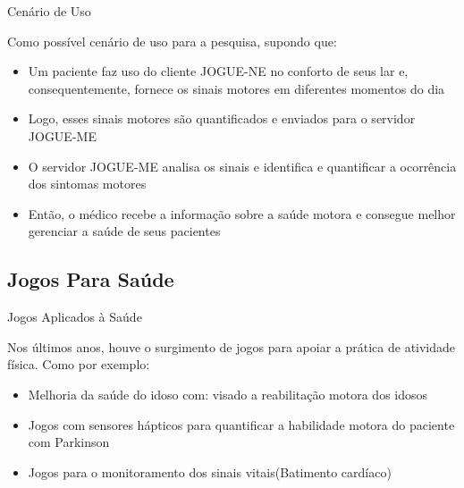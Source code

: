 \documentclass{beamer}
\begin{document}
\begin{frame}{Cenário de Uso}
   \begin{block}{ }
      Como possível cenário de uso para a pesquisa, supondo que:
      \begin{itemize}
       \item Um paciente faz uso do cliente JOGUE-NE no conforto de seus lar e, consequentemente, fornece os sinais motores em diferentes momentos do dia
       \item Logo, esses sinais motores são quantificados e enviados para o servidor JOGUE-ME
       \item O servidor JOGUE-ME analisa os sinais e identifica e quantificar a ocorrência dos sintomas motores
       \item Então, o médico recebe a informação sobre a saúde motora e consegue melhor gerenciar a saúde de seus pacientes 
      \end{itemize}
  \end{block}
\end{frame}

\subsection{Jogos Para Saúde}
\begin{frame}{Jogos Aplicados à Saúde}
	\begin{block}{}	
	Nos últimos anos, houve o surgimento de jogos para apoiar a prática de atividade física. Como por exemplo:
	
	\begin{itemize}
	    \item Melhoria da saúde do idoso com: visado a reabilitação motora dos idosos~\cite{sacbespoke2014}
	    \item Jogos com sensores hápticos para quantificar a habilidade motora do paciente com Parkinson ~\cite{atkinson2010}
	    \item Jogos para o monitoramento dos sinais vitais(Batimento cardíaco)~\cite{Sinclair:2009:UVB:1515604.1515617}
	\end{itemize}
	\end{block}
\end{frame}
\end{document}
